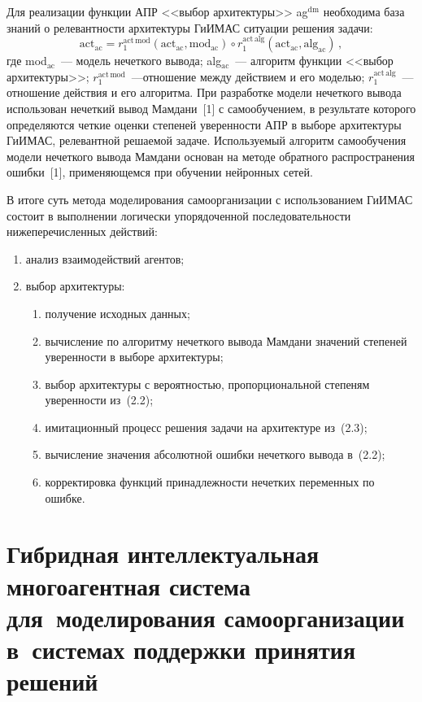 \begin{multicols}{2}
  Для реализации функции АПР <<выбор архитектуры>> ag$^{\mathrm{dm}}$ 
необходима база знаний о ре\-ле\-вант\-ности архитектуры ГиИМАС ситуации 
решения за\-дачи:
  $$
  \mathrm{act}_{\mathrm{ac}}=r_1^{\mathrm{act\,mod}}(\mathrm{act}_{\mathrm{ac}}, 
  \mathrm{mod}_{\mathrm{ac}}) \circ r_1^{\mathrm{act\,alg}} 
(\mathrm{act}_{\mathrm{ac}},\mathrm{alg}_{\mathrm{ac}})\,,
  $$
где mod$_{\mathrm{ac}}$~--- модель нечеткого вывода; alg$_{\mathrm{ac}}$~--- алгоритм функции 
<<выбор архитектуры>>; $r_1^{\mathrm{act\,mod}}$~---\linebreak отношение между действием и 
его моделью; $r_1^{\mathrm{act\,alg}}$~--- отношение действия и его алгоритма. При 
разработке модели нечеткого вывода использован нечеткий вывод Мамдани~[1] 
с самообучением, в результате которого определяются четкие оценки степеней 
уверенности АПР в выборе архитектуры ГиИМАС, релевантной решаемой 
задаче. Используемый алгоритм самообучения модели нечеткого вывода 
Мамдани основан на методе обратного распространения ошибки~[1], 
применяющемся при обучении нейронных сетей.
  
  В итоге суть метода моделирования самоорганизации с использованием 
ГиИМАС состоит в выполнении логически упорядоченной последо\-ва\-тель\-ности 
нижеперечисленных действий: 
  \begin{enumerate}[(1)]
  \item анализ взаимодействий агентов; 
  \item выбор архитектуры: 
  \begin{enumerate}[({2}.1)]
  \item получение исходных данных; 
  \item вычисление по алгоритму нечеткого вывода Мамдани значений 
степеней уверенности в выборе архитектуры; 
  \item выбор архитектуры с вероятностью, пропорциональной степеням 
уверенности из~(2.2); 
  \item имитационный процесс решения задачи на архитектуре из~(2.3); 
  \item вычисление значения абсолютной ошибки нечеткого вывода в~(2.2); 
  \item корректировка функций принадлежности нечетких переменных по 
ошибке. 
  \end{enumerate}
   \end{enumerate}
   
\section{Гибридная интеллектуальная многоагентная система 
для~моделирования самоорганизации в~системах поддержки 
принятия решений}
  

\end{multicols}
